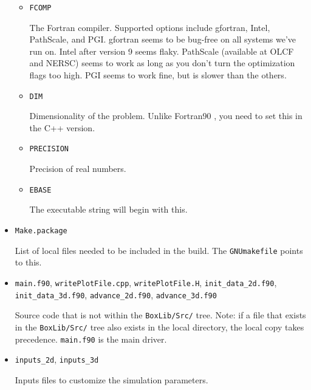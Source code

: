 \begin{itemize}
\begin{itemize}
    \item {\tt FCOMP}

    The Fortran compiler.  Supported options include gfortran, Intel, PathScale, and PGI.  gfortran seems to 
    be bug-free on all systems we've run on.  Intel after version 9 seems flaky.  PathScale (available at 
    OLCF and NERSC) seems to work as long as you don't turn the optimization flags too high.  PGI seems to 
    work fine, but is slower than the others.

    \item {\tt DIM}

    Dimensionality of the problem.  Unlike Fortran90 \BoxLib, you need to set this in the C++ version.

    \item {\tt PRECISION}

    Precision of real numbers.

    \item {\tt EBASE}

    The executable string will begin with this.

  \end{itemize}

\item {\tt Make.package}

List of local files needed to be included in the build.  The {\tt GNUmakefile} points to this.

\item {\tt main.f90}, {\tt writePlotFile.cpp}, {\tt writePlotFile.H}, {\tt init\_data\_2d.f90},
      {\tt init\_data\_3d.f90}, {\tt advance\_2d.f90}, {\tt advance\_3d.f90}

Source code that is not within the {\tt BoxLib/Src/} tree.  Note: if a file that exists in the
{\tt BoxLib/Src/} tree also exists in the local directory, the local copy takes precedence.
{\tt main.f90} is the main driver.

\item {\tt inputs\_2d}, {\tt inputs\_3d}

Inputs files to customize the simulation parameters.

\end{itemize}

